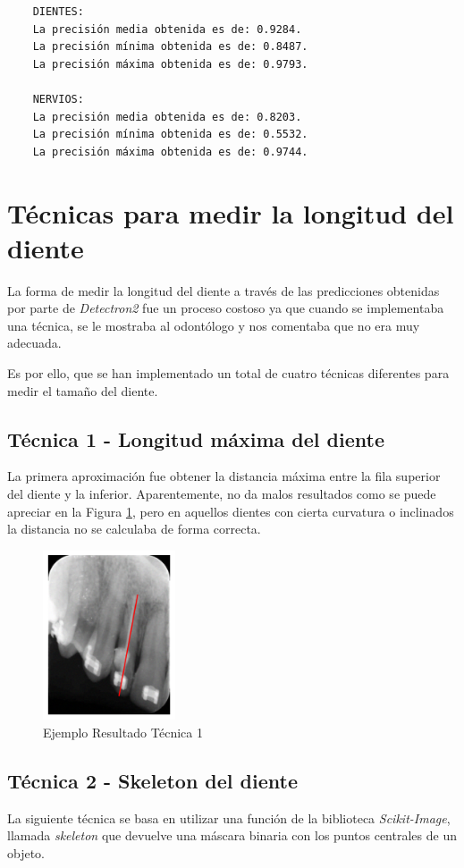 \begin{verbatim}
    DIENTES:
    La precisión media obtenida es de: 0.9284.
    La precisión mínima obtenida es de: 0.8487.
    La precisión máxima obtenida es de: 0.9793.
    
    NERVIOS:
    La precisión media obtenida es de: 0.8203.
    La precisión mínima obtenida es de: 0.5532.
    La precisión máxima obtenida es de: 0.9744.
\end{verbatim}

\section{Técnicas para medir la longitud del diente}
La forma de medir la longitud del diente a través de las predicciones obtenidas por parte de \emph{Detectron2} fue un proceso costoso ya que cuando se implementaba una técnica, se le mostraba al odontólogo y nos comentaba que no era muy adecuada.

Es por ello, que se han implementado un total de cuatro técnicas diferentes para medir el tamaño del diente.

\subsection{Técnica 1 - Longitud máxima del diente}
La primera aproximación fue obtener la distancia máxima entre la fila superior del diente y la inferior. Aparentemente, no da malos resultados como se puede apreciar en la Figura \ref{f:ejemplo1}, pero en aquellos dientes con cierta curvatura o inclinados la distancia no se calculaba de forma correcta.

\begin{figure}[h]
 \centering
  \includegraphics[width=0.35\textwidth]{img/Tecnica1.png}
 \caption{Ejemplo Resultado Técnica 1}
 \label{f:ejemplo1}
\end{figure}

\subsection{Técnica 2 - Skeleton del diente}
La siguiente técnica se basa en utilizar una función de la biblioteca \emph{Scikit-Image}, llamada \emph{skeleton} que devuelve una máscara binaria con los puntos centrales de un objeto. 

